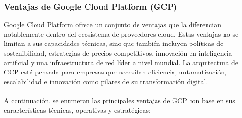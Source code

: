{            \subsubsection{Ventajas de Google Cloud Platform (GCP)}
                Google Cloud Platform ofrece un conjunto de ventajas que la diferencian notablemente dentro del ecosistema de proveedores cloud. Estas ventajas no se limitan a sus capacidades técnicas, sino que también incluyen políticas de sostenibilidad, estrategias de precios competitivos, innovación en inteligencia artificial y una infraestructura de red líder a nivel mundial. La arquitectura de GCP está pensada para empresas que necesitan eficiencia, automatización, escalabilidad e innovación como pilares de su transformación digital.
                
                \paragraph{}A continuación, se enumeran las principales ventajas de GCP con base en sus características técnicas, operativas y estratégicas:
                
}
